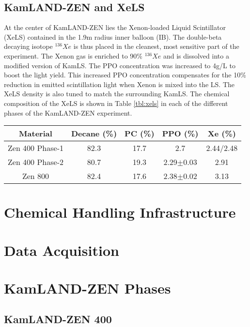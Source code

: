 \subsection{KamLAND-ZEN and XeLS}
At the center of KamLAND-ZEN lies the Xenon-loaded Liquid Scintillator (XeLS) contained in the 1.9m radius inner balloon (IB). The double-beta decaying isotope $^{136}Xe$ is thus placed in the cleanest, most sensitive part of the experiment. The Xenon gas is enriched to 90\% $^{136}Xe$ and is dissolved into a modified version of KamLS. The PPO concentration was increased to 4g/L to boost the light yield. This increased PPO concentration compensates for the 10\% reduction in emitted scintillation light when Xenon is mixed into the LS. The XeLS density is also tuned to match the surrounding KamLS. The chemical composition of the XeLS is shown in Table \ref{tbl:xels} in each of the different phases of the KamLAND-ZEN experiment.

\begin{table}[h]
	\centering
	\renewcommand{\arraystretch}{1.2}
	\begin{tabular}{c|cccc}
		\hline
		Material & Decane (\%) & PC (\%) & PPO (\%) & Xe (\%)\\ \hline
		Zen 400 Phase-1 & 82.3 & 17.7 & 2.7 & 2.44/2.48\\
		Zen 400 Phase-2 & 80.7 & 19.3 & 2.29$\pm$0.03 & 2.91\\
		Zen 800 & 82.4 & 17.6 & 2.38$\pm$0.02 & 3.13\\ \hline
	\end{tabular}
\end{table}

\section{Chemical Handling Infrastructure}

\section{Data Acquisition}

\section{KamLAND-ZEN Phases}

\subsection{KamLAND-ZEN 400}

